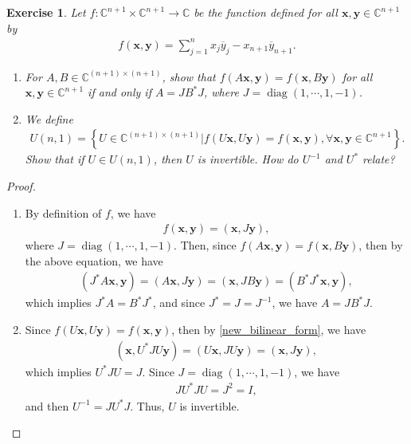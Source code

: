 \documentclass[11pt]{article}
\newtheorem{exercise}{Exercise}[section]
\theoremstyle{definition}
\numberwithin{equation}{subsection}
\begin{document}
\medskip

\begin{exercise}
Let $f: \mathbb{C}^{n+1} \times \mathbb{C}^{n+1} \to \mathbb{C}$ be the function defined for all $\mathbf{x}, \mathbf{y} \in \mathbb{C}^{n+1}$ by
\begin{align*}
    f(\mathbf{x}, \mathbf{y}) = \sum^n_{j=1} x_j \overline{y}_j - x_{n+1} \overline{y}_{n+1}.
\end{align*}
\begin{enumerate}[label=(\alph*)]
    \item For $A, B \in \mathbb{C}^{(n+1) \times (n+1)}$, show that $f(A\mathbf{x}, \mathbf{y}) = f(\mathbf{x}, B\mathbf{y})$ for all $\mathbf{x}, \mathbf{y} \in \mathbb{C}^{n+1}$ if and only if $A = JB^*J$, where $J = \operatorname{diag}(1, \cdots, 1, -1)$.
    
    \item We define
    \begin{align*}
        U(n, 1) = \left\{ U \in \mathbb{C}^{(n+1) \times (n+1)} | f(U\mathbf{x}, U \mathbf{y}) = f(\mathbf{x}, \mathbf{y}), \forall \mathbf{x}, \mathbf{y} \in \mathbb{C}^{n+1} \right\}.
    \end{align*}
    Show that if $U \in U(n,1)$, then $U$ is invertible. How do $U^{-1}$ and $U^*$ relate?
\end{enumerate}
\end{exercise}
\begin{proof}
~\begin{enumerate}[label=(\alph*)]
    \item By definition of $f$, we have
    \begin{align}\label{new_bilinear_form}
        f(\mathbf{x}, \mathbf{y}) = (\mathbf{x}, J\mathbf{y}),
    \end{align}
    where $J = \operatorname{diag}(1, \cdots, 1, -1)$. Then, since $f(A\mathbf{x}, \mathbf{y}) = f(\mathbf{x}, B\mathbf{y})$, then by the above equation, we have
    \begin{align*}
        (J^*A\mathbf{x}, \mathbf{y}) =(A\mathbf{x}, J\mathbf{y}) = (\mathbf{x}, JB\mathbf{y}) = (B^* J^* \mathbf{x}, \mathbf{y}),
    \end{align*}
    which implies $J^*A = B^* J^*$, and since $J^* = J = J^{-1}$, we have $A = J B^* J$.
    
    \item Since $f(U\mathbf{x}, U \mathbf{y}) = f(\mathbf{x}, \mathbf{y})$, then by \ref{new_bilinear_form}, we have
    \begin{align*}
        (\mathbf{x}, U^* J U\mathbf{y}) = (U\mathbf{x}, JU\mathbf{y}) = (\mathbf{x}, J\mathbf{y}),
    \end{align*}
    which implies $U^* J U = J$. Since $J = \operatorname{diag}(1, \cdots, 1, -1)$, we have
    \begin{align*}
        J U^* J U = J^2 = I, 
    \end{align*}
    and then $U^{-1} = J U^* J$. Thus, $U$ is invertible.
\end{enumerate}
\end{proof}
\end{document}
